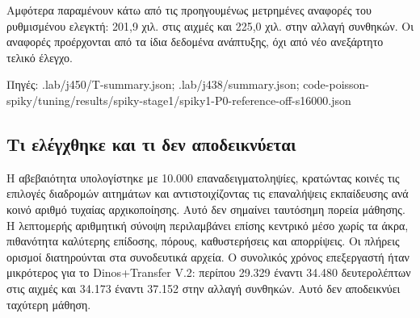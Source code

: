 \documentclass[10pt,a4paper]{article}
\newcommand{\src}[1]{\par{\scriptsize\color{gray}Πηγές: {\ttfamily #1}}\par}
\begin{document}
Αμφότερα παραμένουν κάτω από τις προηγουμένως μετρημένες αναφορές του ρυθμισμένου ελεγκτή: 201,9 χιλ. στις αιχμές και 225,0 χιλ. στην αλλαγή συνθηκών. Οι αναφορές προέρχονται από τα ίδια δεδομένα ανάπτυξης, όχι από νέο ανεξάρτητο τελικό έλεγχο.
\src{.lab/\allowbreak j450/\allowbreak T-\allowbreak summary.json; .lab/\allowbreak j438/\allowbreak summary.json; code-\allowbreak poisson-\allowbreak spiky/\allowbreak tuning/\allowbreak results/\allowbreak spiky-\allowbreak stage1/\allowbreak spiky1-\allowbreak P0-\allowbreak reference-\allowbreak off-\allowbreak s16000.json}
\subsection*{Τι ελέγχθηκε και τι δεν αποδεικνύεται}
Η αβεβαιότητα υπολογίστηκε με 10.000 επαναδειγματοληψίες, κρατώντας κοινές τις επιλογές διαδρομών αιτημάτων και αντιστοιχίζοντας τις επαναλήψεις εκπαίδευσης ανά κοινό αριθμό τυχαίας αρχικοποίησης. Αυτό δεν σημαίνει ταυτόσημη πορεία μάθησης. Η λεπτομερής αριθμητική σύνοψη περιλαμβάνει επίσης κεντρικό μέσο χωρίς τα άκρα, πιθανότητα καλύτερης επίδοσης, πόρους, καθυστερήσεις και απορρίψεις. Οι πλήρεις ορισμοί διατηρούνται στα συνοδευτικά αρχεία. Ο συνολικός χρόνος επεξεργαστή ήταν μικρότερος για το Dinos+Transfer V.2: περίπου 29.329 έναντι 34.480 δευτερολέπτων στις αιχμές και 34.173 έναντι 37.152 στην αλλαγή συνθηκών. Αυτό δεν αποδεικνύει ταχύτερη μάθηση.
\end{document}
